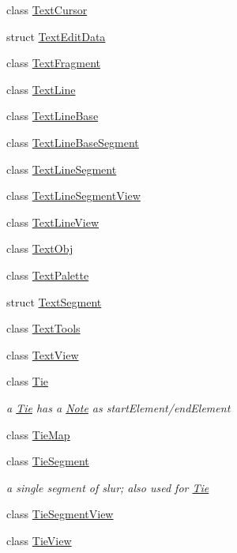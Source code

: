 \begin{DoxyCompactItemize}
\item 
class \hyperlink{class_ms_1_1_text_cursor}{Text\+Cursor}
\item 
struct \hyperlink{struct_ms_1_1_text_edit_data}{Text\+Edit\+Data}
\item 
class \hyperlink{class_ms_1_1_text_fragment}{Text\+Fragment}
\item 
class \hyperlink{class_ms_1_1_text_line}{Text\+Line}
\item 
class \hyperlink{class_ms_1_1_text_line_base}{Text\+Line\+Base}
\item 
class \hyperlink{class_ms_1_1_text_line_base_segment}{Text\+Line\+Base\+Segment}
\item 
class \hyperlink{class_ms_1_1_text_line_segment}{Text\+Line\+Segment}
\item 
class \hyperlink{class_ms_1_1_text_line_segment_view}{Text\+Line\+Segment\+View}
\item 
class \hyperlink{class_ms_1_1_text_line_view}{Text\+Line\+View}
\item 
class \hyperlink{class_ms_1_1_text_obj}{Text\+Obj}
\item 
class \hyperlink{class_ms_1_1_text_palette}{Text\+Palette}
\item 
struct \hyperlink{struct_ms_1_1_text_segment}{Text\+Segment}
\item 
class \hyperlink{class_ms_1_1_text_tools}{Text\+Tools}
\item 
class \hyperlink{class_ms_1_1_text_view}{Text\+View}
\item 
class \hyperlink{class_ms_1_1_tie}{Tie}
\begin{DoxyCompactList}\small\item\em a \hyperlink{class_ms_1_1_tie}{Tie} has a \hyperlink{class_ms_1_1_note}{Note} as start\+Element/end\+Element \end{DoxyCompactList}\item 
class \hyperlink{class_ms_1_1_tie_map}{Tie\+Map}
\item 
class \hyperlink{class_ms_1_1_tie_segment}{Tie\+Segment}
\begin{DoxyCompactList}\small\item\em a single segment of slur; also used for \hyperlink{class_ms_1_1_tie}{Tie} \end{DoxyCompactList}\item 
class \hyperlink{class_ms_1_1_tie_segment_view}{Tie\+Segment\+View}
\item 
class \hyperlink{class_ms_1_1_tie_view}{Tie\+View}
\item 

\end{DoxyCompactItemize}
